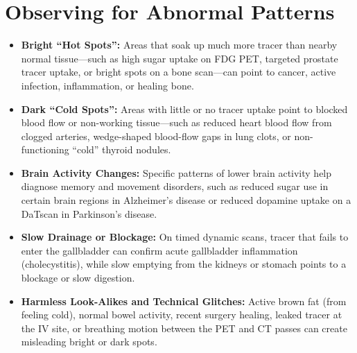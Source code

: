 \section{Observing for Abnormal Patterns}
\begin{itemize}
  \item \textbf{Bright ``Hot Spots'':} Areas that soak up much more tracer than nearby normal tissue---such as high sugar uptake on FDG PET, targeted prostate tracer uptake, or bright spots on a bone scan---can point to cancer, active infection, inflammation, or healing bone.
  \item \textbf{Dark ``Cold Spots'':} Areas with little or no tracer uptake point to blocked blood flow or non-working tissue---such as reduced heart blood flow from clogged arteries, wedge-shaped blood-flow gaps in lung clots, or non-functioning ``cold'' thyroid nodules.
  \item \textbf{Brain Activity Changes:} Specific patterns of lower brain activity help diagnose memory and movement disorders, such as reduced sugar use in certain brain regions in Alzheimer's disease or reduced dopamine uptake on a DaTscan in Parkinson's disease.
  \item \textbf{Slow Drainage or Blockage:} On timed dynamic scans, tracer that fails to enter the gallbladder can confirm acute gallbladder inflammation (cholecystitis), while slow emptying from the kidneys or stomach points to a blockage or slow digestion.
  \item \textbf{Harmless Look-Alikes and Technical Glitches:} Active brown fat (from feeling cold), normal bowel activity, recent surgery healing, leaked tracer at the IV site, or breathing motion between the PET and CT passes can create misleading bright or dark spots.
\end{itemize}

